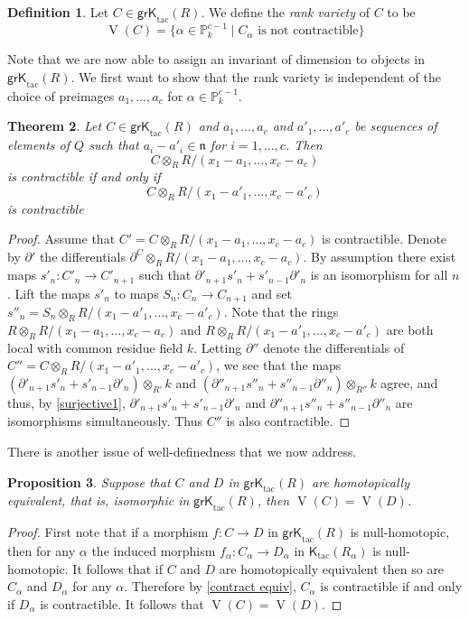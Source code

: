 \documentclass{amsart}[11pt]
\newcommand{\n}{{\mathfrak n}}
\newcommand{\V}{\operatorname{V}}
\newcommand{\Ktac}{\operatorname{\mathsf{K}_{tac}}\nolimits}
\newcommand{\grKtac}{\operatorname{\mathsf{grK}_{tac}}\nolimits}
\numberwithin{equation}{section}
\theoremstyle{plain}
\newtheorem{theorem}{Theorem}[section]
\newtheorem*{Main Theorem}{Main Theorem}
\newtheorem{proposition}[theorem]{Proposition}
\theoremstyle{definition}
\newtheorem{definition}[theorem]{Definition}
\theoremstyle{remark}
\numberwithin{equation}{theorem}
\begin{document}
\begin{definition} Let $C\in\grKtac(R)$.  We define the \emph{rank variety} of $C$ to be
\[
\V(C)=\{\alpha\in\mathbb P^{c-1}_k\mid C_\alpha\text{ is not contractible}\}
\]
\end{definition}

Note that we are now able to assign an invariant of dimension to objects in $\grKtac(R)$.
We first want to show that the rank variety is independent of the choice of preimages 
$a_1,\dots,a_c$ for $\alpha\in\mathbb P^{c-1}_k$. 

\begin{theorem}\label{independent} Let $C\in\grKtac(R)$ and $a_1,\dots,a_c$ and $a'_1,\dots,a'_c$ be sequences of elements of $Q$ such that $a_i-a'_i\in\n$ for $i=1,\dots,c$. Then
\[
C\otimes_RR/(x_1-a_1,\dots,x_c-a_c)
\] 
is contractible if and only if 
\[
C\otimes_RR/(x_1-a'_1,\dots,x_c-a'_c)
\] 
is contractible 
\end{theorem}

\begin{proof} Assume that $C'=C\otimes_RR/(x_1-a_1,\dots,x_c-a_c)$ is contractible.  Denote by
$\partial'$ the differentials $\partial^C\otimes_RR/(x_1-a_1,\dots,x_c-a_c)$. By assumption
there exist maps $s'_n:C'_n\to C'_{n+1}$ such that  
$\partial'_{n+1}s'_n+s'_{n-1}\partial'_n$ is an isomorphism for all $n$.  Lift the maps $s'_n$ to maps 
$S_n:C_n\to C_{n+1}$ and set $s''_n=S_n\otimes_RR/(x_1-a'_1,\dots,x_c-a'_c)$. Note that 
the rings $R\otimes_RR/(x_1-a_1,\dots,x_c-a_c)$ and $R\otimes_RR/(x_1-a'_1,\dots,x_c-a'_c)$
are both local with common residue field $k$.  Letting $\partial''$ denote the differentials of
$C''=C\otimes_RR/(x_1-a'_1,\dots,x_c-a'_c)$, we see that the maps 
$(\partial'_{n+1}s'_n+s'_{n-1}\partial'_n)\otimes_{R'}k$ and $(\partial''_{n+1}s''_n+s''_{n-1}\partial''_n)\otimes_{R''}k$ agree, and thus, by \ref{surjective1}, $\partial'_{n+1}s'_n+s'_{n-1}\partial'_n$ 
and $\partial''_{n+1}s''_n+s''_{n-1}\partial''_n$ are isomorphisms simultaneously. Thus $C''$ is also contractible.
\end{proof}

There is another issue of well-definedness that we now address. 

\begin{proposition}\label{homeq}
Suppose that $C$ and $D$ in $\grKtac(R)$ are homotopically equivalent, that is, isomorphic in 
$\grKtac(R)$, then $\V(C)=\V(D)$.
\end{proposition}

\begin{proof} First note that if a morphism $f:C\to D$ in $\grKtac(R)$ is null-homotopic, then for any $\alpha$ the induced morphism $f_\alpha:C_\alpha\to D_\alpha$ in $\Ktac(R_\alpha)$ is null-homotopic. It follows that if $C$ and $D$ are homotopically equivalent then so are 
$C_\alpha$ and $D_\alpha$ for any $\alpha$. Therefore by \ref{contract equiv}, $C_\alpha$ is contractible if and only if $D_\alpha$ is contractible. It follows that $\V(C)=\V(D)$.
\end{proof}
\end{document}
